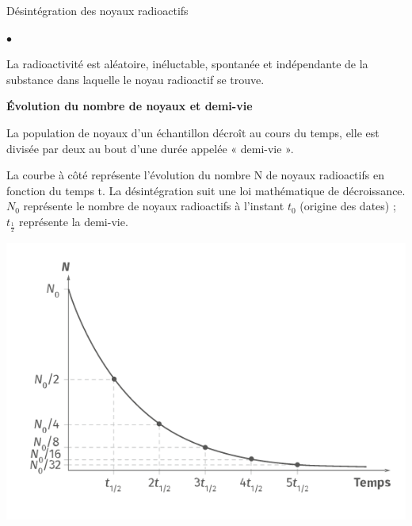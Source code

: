 \documentclass[24pt]{article}
\begin{document}
\begin{concept}{Désintégration des noyaux radioactifs }
\begin{list}{$\bullet$}{}
              \vspace{10pt}
        \item La radioactivité est aléatoire, inéluctable, spontanée et indépendante de
              la substance dans laquelle le noyau radioactif se trouve.
    \end{list}

    \begin{center}
        \textbf{Évolution du nombre de noyaux et demi-vie }
    \end{center}

    \begin{minipage}[c]{0.7\textwidth}
        La population de noyaux d’un échantillon décroît au cours du temps,
        elle est divisée par deux au bout d’une durée appelée « demi-vie ».

        La courbe à côté représente l’évolution du nombre N de noyaux radioactifs en fonction
        du temps t. La désintégration suit une loi mathématique de décroissance.
        $N_0$ représente le nombre de noyaux radioactifs à l’instant $t_0$ (origine des dates) ;
        $t_{\frac{1}{2}}$ représente la demi-vie.
    \end{minipage}
    \hspace{0.05\textwidth}
    \begin{minipage}[c]{0.2\textwidth}
        \begin{center}
            \includegraphics[width=1.2\columnwidth]{nuclear4.png}
        \end{center}
    \end{minipage}
\end{concept}
\end{document}
